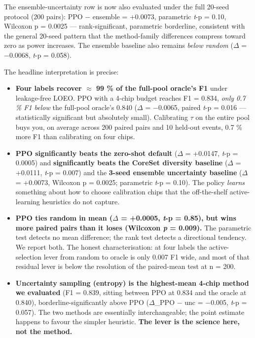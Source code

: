The ensemble-uncertainty row is now also evaluated under the full
20-seed protocol (200 pairs): PPO $-$ ensemble = +0.0073, parametric
\emph{t}-p = 0.10, Wilcoxon p = 0.0025 --- rank-significant, parametric
borderline, consistent with the general 20-seed pattern that the
method-family differences compress toward zero as power increases.
The ensemble baseline also remains \emph{below random} ($\Delta$ = $-$0.0068,
\emph{t}-p = 0.058).

The headline interpretation is precise:

\begin{itemize}
\tightlist
\item
  \textbf{Four labels recover $\approx$ 99 \% of the full-pool oracle's F1} under
  leakage-free LOEO. PPO with a 4-chip budget reaches F1 = 0.834,
  \emph{only 0.7 \% F1 below} the full-pool oracle's 0.840 ($\Delta$ = $-$0.0065,
  paired \emph{t}-p = 0.016 --- statistically significant but absolutely
  small). Calibrating $\tau$ on the entire pool buys you, on average across
  200 paired pairs and 10 held-out events, 0.7 \% more F1 than calibrating
  on four chips.
\item
  \textbf{PPO significantly beats the zero-shot default} ($\Delta$ = +0.0147,
  \emph{t}-p = 0.0005) and \textbf{significantly beats the CoreSet diversity
  baseline} ($\Delta$ = +0.0111, \emph{t}-p = 0.007) and the \textbf{3-seed ensemble
  uncertainty baseline} ($\Delta$ = +0.0073, Wilcoxon p = 0.0025;
  parametric \emph{t}-p = 0.10). The policy
  \emph{learns} something about how to choose calibration chips that the
  off-the-shelf active-learning heuristics do not capture.
\item
  \textbf{PPO ties random in mean ($\Delta$ = +0.0005, \emph{t}-p = 0.85), but wins more
  paired pairs than it loses (Wilcoxon \emph{p} = 0.009).} The parametric
  test detects no mean difference; the rank test detects a directional
  tendency. We report both. The honest characterisation: at four labels
  the active-selection lever from random to oracle is only 0.007 F1
  wide, and most of that residual lever is below the resolution of the
  paired-mean test at n = 200.
\item
  \textbf{Uncertainty sampling (entropy) is the highest-mean 4-chip method we
  evaluated} (F1 = 0.839, sitting between PPO at 0.834 and the oracle
  at 0.840), borderline-significantly above PPO ($\Delta$\_PPO $-$ unc = $-$0.005,
  \emph{t}-p = 0.057). The two methods are essentially interchangeable; the
  point estimate happens to favour the simpler heuristic. \textbf{The lever
  is the science here, not the method.}
\end{itemize}

